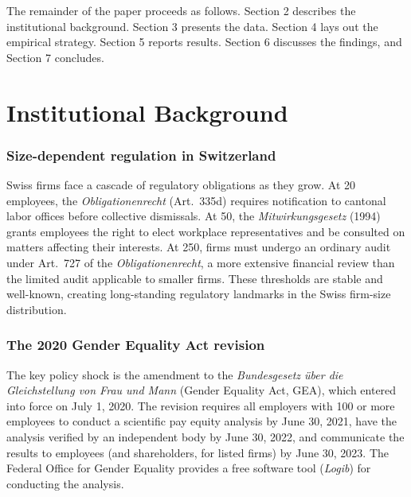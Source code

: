 \documentclass[12pt]{article}
\begin{document}
The remainder of the paper proceeds as follows. Section 2 describes the institutional background. Section 3 presents the data. Section 4 lays out the empirical strategy. Section 5 reports results. Section 6 discusses the findings, and Section 7 concludes.

\section{Institutional Background}

\subsubsection*{Size-dependent regulation in Switzerland} Swiss firms face a cascade of regulatory obligations as they grow. At 20 employees, the \emph{Obligationenrecht} (Art.~335d) requires notification to cantonal labor offices before collective dismissals. At 50, the \emph{Mitwirkungsgesetz} (1994) grants employees the right to elect workplace representatives and be consulted on matters affecting their interests. At 250, firms must undergo an ordinary audit under Art.~727 of the \emph{Obligationenrecht}, a more extensive financial review than the limited audit applicable to smaller firms. These thresholds are stable and well-known, creating long-standing regulatory landmarks in the Swiss firm-size distribution.

\subsubsection*{The 2020 Gender Equality Act revision} The key policy shock is the amendment to the \emph{Bundesgesetz \"uber die Gleichstellung von Frau und Mann} (Gender Equality Act, GEA), which entered into force on July 1, 2020. The revision requires all employers with 100 or more employees to conduct a scientific pay equity analysis by June 30, 2021, have the analysis verified by an independent body by June 30, 2022, and communicate the results to employees (and shareholders, for listed firms) by June 30, 2023. The Federal Office for Gender Equality provides a free software tool (\emph{Logib}) for conducting the analysis.
\end{document}
